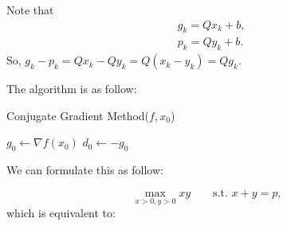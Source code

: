 \documentclass[
  course = {{16-811 Math Fundamentals for Robotics}},
  quartile = {{1}},
  assignment = 4,
  name = {{Kangle Deng}},
  email = {{kangled@andrew.cmu.edu}},
  firstexercise = 1
]{aga-homework}
\begin{document}
\subexercise
Note that
\begin{equation*}
    \begin{aligned}
       & g_k = Qx_k + b, \\
       & p_k = Qy_k + b.
    \end{aligned}
\end{equation*}
So, $g_k - p_k = Qx_k - Qy_k = Q(x_k - y_k) = Qg_k$.

\subexercise


The algorithm is as follow:

\begin{algorithm}[H]
  \caption{Conjugate Gradient Method($f, x_0$)}

  $g_0 \leftarrow \nabla f(x_0)$ \;
  $d_0 \leftarrow -g_0$ \;

\end{algorithm}

\exercise
We can formulate this as follow:

\begin{equation*}
    \max \limits_{x>0, y>0} xy \qquad \text{s.t. } x + y = p,
\end{equation*}
which is equivalent to:
\end{document}
